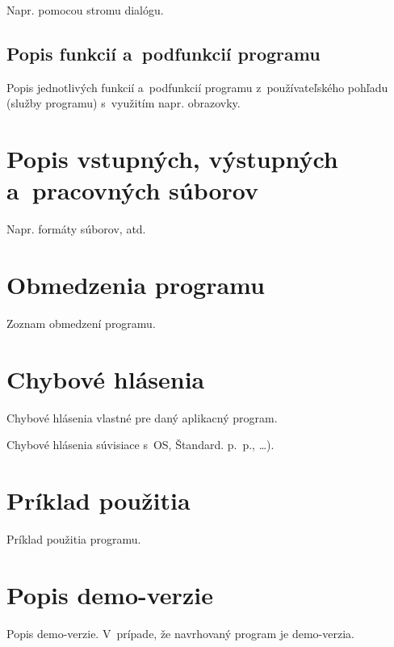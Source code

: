 \documentclass[a4paper]{feidippp}
\begin{document}
Napr. pomocou stromu dialógu.

\subsection{Popis funkcií a~podfunkcií programu}

Popis jednotlivých funkcií a~podfunkcií programu z~používateľského pohľadu (služby programu) s~využitím napr.  obrazovky.

\section{Popis vstupných, výstupných a~pracovných súborov}

Napr. formáty súborov, atd.

\section{Obmedzenia programu}

Zoznam obmedzení programu.

\section{Chybové hlásenia}

Chybové hlásenia vlastné pre daný aplikacný program.

Chybové hlásenia súvisiace s~OS, Štandard. p.~p., \dots).

\section{Príklad použitia}

Príklad použitia programu.

\section{Popis demo-verzie}

Popis demo-verzie. V~prípade, že navrhovaný program je demo-verzia.

\listoffigures

\listoftables


\def\refname{Zoznam použitej literatúry}
\end{document}
